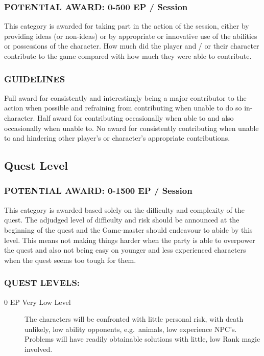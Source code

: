 \documentclass{article}
\begin{document}
\begin{multicols}{2}
\subsubsection{POTENTIAL AWARD: 0-500 EP / Session}

This category is awarded for taking part in the action of the session,
either by providing ideas (or non-ideas) or by appropriate or
innovative use of the abilities or possessions of the character.  How
much did the player and / or their character contribute to the game
compared with how much they were able to contribute.

\subsubsection{GUIDELINES}

Full award for consistently and interestingly being a major
contributor to the action when possible and refraining from
contributing when unable to do so in-character.  Half award for
contributing occasionally when able to and also occasionally when
unable to.  No award for consistently contributing when unable to and
hindering other player's or character's appropriate contributions.

\subsection{Quest Level}

\subsubsection{POTENTIAL AWARD: 0-1500 EP / Session}

This category is awarded based solely on the difficulty and complexity
of the quest.  The adjudged level of difficulty and risk should be
announced at the beginning of the quest and the Game-master should
endeavour to abide by this level.  This means not making things harder
when the party is able to overpower the quest and also not being easy
on younger and less experienced characters when the quest seems too
tough for them.

\subsubsection{QUEST LEVELS:}
\begin{description}

\item[0 EP Very Low Level]
The characters will be confronted with little personal risk, with death
unlikely, low ability opponents, e.g.\  animals, low experience NPC's.
Problems will have readily obtainable solutions with little, low Rank
magic involved.


\end{description}
\end{multicols}
\end{document}
